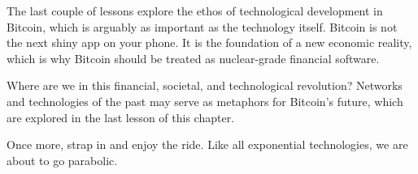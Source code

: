 The last couple of lessons explore the ethos of technological development in
Bitcoin, which is arguably as important as the technology itself. Bitcoin is not
the next shiny app on your phone. It is the foundation of a new economic
reality, which is why Bitcoin should be treated as nuclear-grade financial
software.

Where are we in this financial, societal, and technological revolution? Networks
and technologies of the past may serve as metaphors for Bitcoin's future, which
are explored in the last lesson of this chapter.

Once more, strap in and enjoy the ride. Like all exponential technologies, we
are about to go parabolic.
